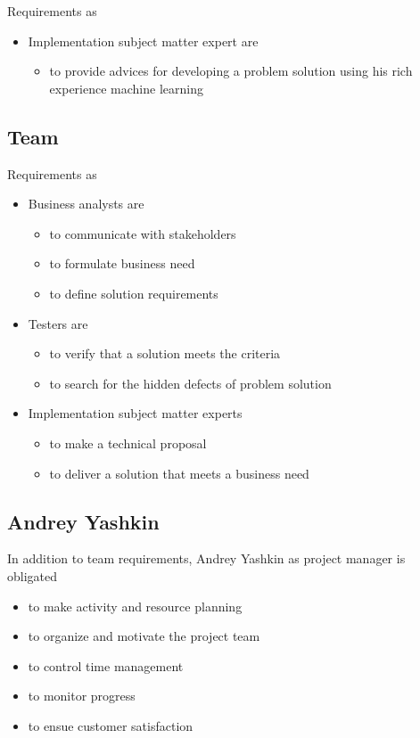 Requirements as
\begin{itemize}
	\item Implementation subject matter expert are
	\begin{itemize}
		\item to provide advices for developing a problem solution using his rich experience machine learning
	\end{itemize}
\end{itemize}


\subsection{Team}
Requirements as
\begin{itemize}
	\item Business analysts are
	\begin{itemize}
		\item to communicate with stakeholders
		\item to formulate business need
		\item to define solution requirements
	\end{itemize}
	\item Testers are
	\begin{itemize}
		\item to verify that a solution meets the criteria
		\item to search for the hidden defects of problem solution
	\end{itemize}
	\item Implementation subject matter experts
	\begin{itemize}
		\item to make a technical proposal
		\item to deliver a solution that meets a business need
	\end{itemize}
\end{itemize}

\subsection{Andrey Yashkin}
In addition to team requirements, Andrey Yashkin as project manager is obligated 
\begin{itemize}
	\item to make activity and resource planning
	\item to organize and motivate the project team
	\item to control time management
	\item to monitor progress
	\item to ensue customer satisfaction
\end{itemize}